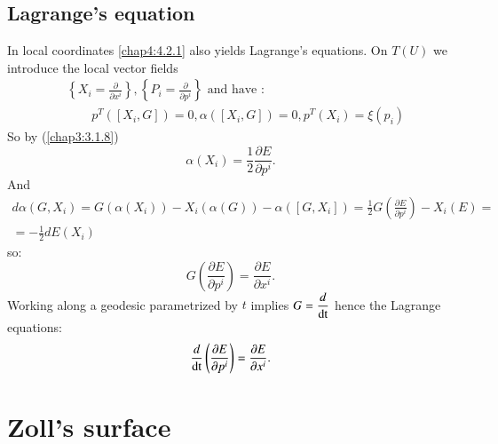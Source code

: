 \subsection{Lagrange's equation}\label{chap4:4.7.20} 

In local coordinates \eqref{chap4:4.2.1} also yields Lagrange's
equations. On $T(U)$ we introduce the local vector fields
\begin{align*}
& \left\{X_{i}=\frac{\partial}{\partial x^{i}}\right\},
  \left\{P_{i}=\frac{\partial}{\partial p^{i}}\right\}\text{ \  and
    have~:}\\
&\qquad
  p^{T}\left(\left[X_{i},G\right]\right)=0,\alpha\left(\left[X_{i},G\right]\right)=0, p^{T}(X_{i})=\xi(p_{i})
\end{align*}
So by (\ref{chap3:3.1.8})
$$
\alpha(X_{i})=\frac{1}{2}\frac{\partial E}{\partial p^{i}}.
$$
And
\begin{gather*}
d\alpha(G,X_{i})=G(\alpha(X_{i}))-X_{i}(\alpha(G))-\alpha([G,X_{i}])=\frac{1}{2}G\left(\frac{\partial
  E}{\partial p^{i}}\right)-X_{i}(E)=\\
=-\frac{1}{2}dE(X_{i})
\end{gather*}
so:\pageoriginale
$$
G\left(\frac{\partial E}{\partial p^{i}}\right)=\frac{\partial
  E}{\partial x^{i}}.
$$
Working along a geodesic parametrized by $t$ implies $G=\dfrac{d}{\operatorname{dt}}$
hence the Lagrange equations:
$$
\frac{d}{\operatorname{dt}}\left(\frac{\partial E}{\partial
  p^{i}}\right)=\frac{\partial E}{\partial x^{i}}.
$$

\section{Zoll's surface}\label{chap4:sec8}

